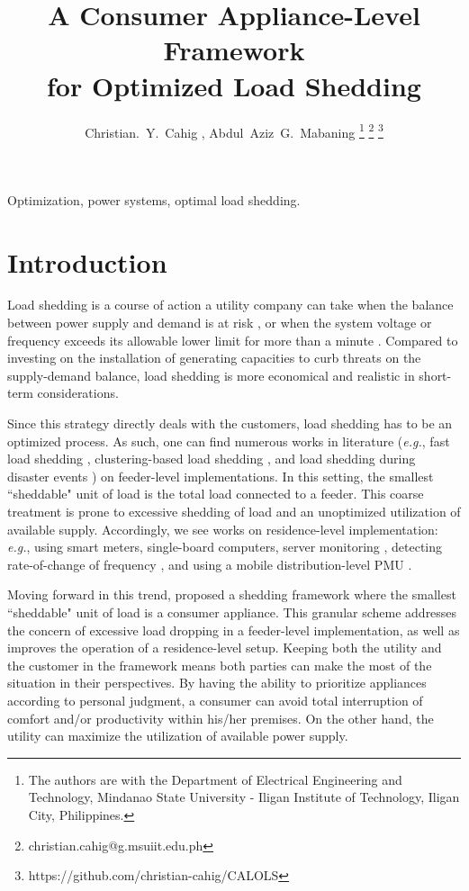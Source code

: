\documentclass[journal, a4paper]{IEEEtran}
\title{A Consumer Appliance-Level Framework\\for Optimized Load Shedding}
\author{
	Christian.~Y.~Cahig \textsuperscript{\faIcon[regular]{envelope}}, Abdul~Aziz~G.~Mabaning%
\thanks{
	The authors are with the Department of Electrical Engineering and Technology,
	Mindanao State University - Iligan Institute of Technology,
	Iligan City, Philippines.
}%
\thanks{\faIcon[regular]{envelope} {\color{blue}christian.cahig@g.msuiit.edu.ph}}%
\thanks{\faIcon{github} {\color{blue}https://github.com/christian-cahig/CALOLS}}
}
\begin{document}
\maketitle


\begin{abstract}
\lipsum[17]
\end{abstract}

\begin{IEEEkeywords}
Optimization, power systems, optimal load shedding.
\end{IEEEkeywords}

\section{Introduction}
\label{sec: Introduction}

Load shedding is a course of action a utility company can take
when the balance between power supply and demand is at risk \cite{Jabian2018},
or when the system voltage or frequency exceeds its allowable lower limit for more than a minute \cite{GMC2016}.
Compared to investing on the installation of generating capacities to curb threats on the supply-demand balance,
load shedding is more economical and realistic in short-term considerations.

Since this strategy directly deals with the customers, load shedding has to be an optimized process.
As such, one can find numerous works in literature
(\textit{e.g.},
fast load shedding \cite{Wester2014},
clustering-based load shedding \cite{Potel2019}, and
load shedding during disaster events \cite{Babaei2020})
on feeder-level implementations.
In this setting, the smallest ``sheddable" unit of load is the total load connected to a feeder.
This coarse treatment is prone to excessive shedding of load and an unoptimized utilization of available supply.
Accordingly, we see works on residence-level implementation:
\textit{e.g.},
using smart meters, single-board computers, server monitoring \cite{Bhattacherjee2019},
detecting rate-of-change of frequency \cite{Sigrist2015},
and using a mobile distribution-level PMU \cite{Yao2020}.

Moving forward in this trend, \cite{Jabian2020} proposed a shedding framework where the smallest ``sheddable" unit of load is a consumer appliance.
This granular scheme addresses the concern of excessive load dropping in a feeder-level implementation,
as well as improves the operation of a residence-level setup.
Keeping both the utility and the customer in the framework means both parties can make the most of the situation in their perspectives.
By having the ability to prioritize appliances according to personal judgment, a consumer can avoid total interruption of comfort and/or productivity within his/her premises.
On the other hand, the utility can maximize the utilization of available power supply.
\end{document}
